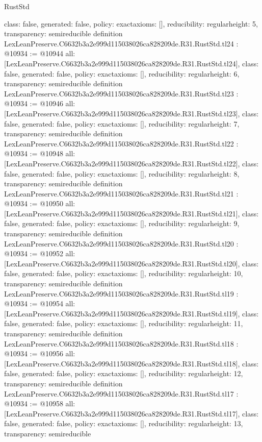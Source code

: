 \begin{lexlean}{RustStd}
\begin{coremodule}
{  class: false,
  generated: false,
  policy: exact{axioms: []},
  reducibility: regular{height: 5},
  transparency: semireducible
}
definition LexLeanPreserve.C6632b3a2e999d115038026ca828209de.R31.RustStd.tl24 : @10934 := @10944 {
  all: [LexLeanPreserve.C6632b3a2e999d115038026ca828209de.R31.RustStd.tl24],
  class: false,
  generated: false,
  policy: exact{axioms: []},
  reducibility: regular{height: 6},
  transparency: semireducible
}
definition LexLeanPreserve.C6632b3a2e999d115038026ca828209de.R31.RustStd.tl23 : @10934 := @10946 {
  all: [LexLeanPreserve.C6632b3a2e999d115038026ca828209de.R31.RustStd.tl23],
  class: false,
  generated: false,
  policy: exact{axioms: []},
  reducibility: regular{height: 7},
  transparency: semireducible
}
definition LexLeanPreserve.C6632b3a2e999d115038026ca828209de.R31.RustStd.tl22 : @10934 := @10948 {
  all: [LexLeanPreserve.C6632b3a2e999d115038026ca828209de.R31.RustStd.tl22],
  class: false,
  generated: false,
  policy: exact{axioms: []},
  reducibility: regular{height: 8},
  transparency: semireducible
}
definition LexLeanPreserve.C6632b3a2e999d115038026ca828209de.R31.RustStd.tl21 : @10934 := @10950 {
  all: [LexLeanPreserve.C6632b3a2e999d115038026ca828209de.R31.RustStd.tl21],
  class: false,
  generated: false,
  policy: exact{axioms: []},
  reducibility: regular{height: 9},
  transparency: semireducible
}
definition LexLeanPreserve.C6632b3a2e999d115038026ca828209de.R31.RustStd.tl20 : @10934 := @10952 {
  all: [LexLeanPreserve.C6632b3a2e999d115038026ca828209de.R31.RustStd.tl20],
  class: false,
  generated: false,
  policy: exact{axioms: []},
  reducibility: regular{height: 10},
  transparency: semireducible
}
definition LexLeanPreserve.C6632b3a2e999d115038026ca828209de.R31.RustStd.tl19 : @10934 := @10954 {
  all: [LexLeanPreserve.C6632b3a2e999d115038026ca828209de.R31.RustStd.tl19],
  class: false,
  generated: false,
  policy: exact{axioms: []},
  reducibility: regular{height: 11},
  transparency: semireducible
}
definition LexLeanPreserve.C6632b3a2e999d115038026ca828209de.R31.RustStd.tl18 : @10934 := @10956 {
  all: [LexLeanPreserve.C6632b3a2e999d115038026ca828209de.R31.RustStd.tl18],
  class: false,
  generated: false,
  policy: exact{axioms: []},
  reducibility: regular{height: 12},
  transparency: semireducible
}
definition LexLeanPreserve.C6632b3a2e999d115038026ca828209de.R31.RustStd.tl17 : @10934 := @10958 {
  all: [LexLeanPreserve.C6632b3a2e999d115038026ca828209de.R31.RustStd.tl17],
  class: false,
  generated: false,
  policy: exact{axioms: []},
  reducibility: regular{height: 13},
  transparency: semireducible
}
\end{coremodule}
\end{lexlean}
